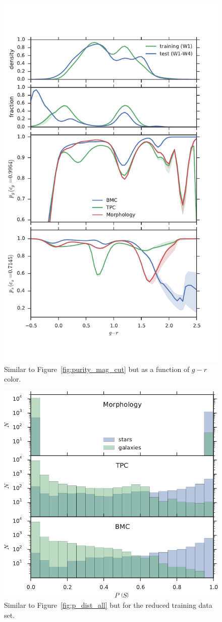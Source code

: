 \begin{figure}[htp]
  \centering
  \includegraphics[width=0.7\linewidth]{figures/purity_g_r_cut.pdf}
  \caption{Similar to Figure~\ref{fig:purity_mag_cut}
           but as a function of $g-r$ color.}
  \label{fig:purity_g_r_cut}
\end{figure}

\begin{figure}[htp]
    \centering
  \includegraphics[width=0.7\linewidth]{figures/p_dist_cut.pdf}
  \caption{Similar to Figure~\ref{fig:p_dist_all}
           but for the reduced training data set.}
  \label{fig:p_dist_cut}
\end{figure}

